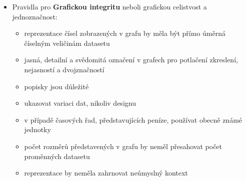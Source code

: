 \documentclass[12pt,]{article}
\providecommand{\tightlist}{%
  \setlength{\itemsep}{0pt}\setlength{\parskip}{0pt}}
\begin{document}
\begin{itemize}
\tightlist
\item
  Pravidla pro \textbf{Grafickou integritu} neboli grafickou celistvost
  a jednoznačnost:

  \begin{itemize}
  \tightlist
  \item
    reprezentace čísel zobrazených v grafu by měla být přímo úměrná
    číselným veličinám datasetu
  \item
    jasná, detailní a svědomitá označení v grafech pro potlačení
    zkreslení, nejasností a dvojznačností
  \item
    popisky jsou důležité
  \item
    ukazovat variaci dat, nikoliv designu
  \item
    v případě časových řad, představujících peníze, používat obecně
    známé jednotky
  \item
    počet rozměrů představených v grafu by neměl přesahovat počet
    proměnných datasetu
  \item
    reprezentace by neměla zahrnovat neúmyslný kontext
  \end{itemize}
\end{itemize}
\end{document}
